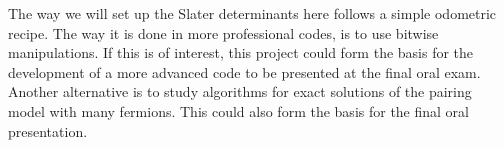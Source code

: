 \documentclass[prc]{revtex4}
\begin{document}
The way we will set up the Slater determinants here follows a simple odometric recipe. The way it is done in more professional codes, is to use bitwise manipulations. If this is of interest, this project could form the basis for the development of a more advanced code
to be presented at the final oral exam. Another alternative is to study algorithms for exact solutions of the pairing model with many fermions. This could also form the basis for the final oral presentation.  
\end{document}
